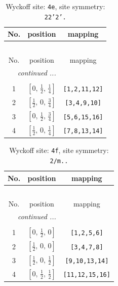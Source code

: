 \documentclass[fleqn,8pt]{jsarticle}
\begin{document}
\begin{longtable}{ccc}
\caption{Wyckoff site: {\tt 4e}, site symmetry: {\tt 22'2'.}}
 \\
 \hline \hline
No. & position & mapping \\ \hline \endfirsthead

\multicolumn{2}{l}{\tablename\ \thetable{}} \\
 \hline \hline
No. & position & mapping \\ \hline \endhead

 \hline \hline
\multicolumn{2}{r}{\footnotesize\it continued ...} \\ \endfoot

 \hline \hline
\multicolumn{2}{r}{} \\ \endlastfoot

1 & $\left[ 0,\, \frac{1}{2},\, \frac{1}{4} \right]$ & {\tt [1,2,11,12]} \\ \hline
2 & $\left[ \frac{1}{2},\, 0,\, \frac{3}{4} \right]$ & {\tt [3,4,9,10]} \\ \hline
3 & $\left[ 0,\, \frac{1}{2},\, \frac{3}{4} \right]$ & {\tt [5,6,15,16]} \\ \hline
4 & $\left[ \frac{1}{2},\, 0,\, \frac{1}{4} \right]$ & {\tt [7,8,13,14]} \\
\end{longtable}
\renewcommand{\arraystretch}{1.2}
\begin{longtable}{ccc}
\caption{Wyckoff site: {\tt 4f}, site symmetry: {\tt 2/m..}}
 \\
 \hline \hline
No. & position & mapping \\ \hline \endfirsthead

\multicolumn{2}{l}{\tablename\ \thetable{}} \\
 \hline \hline
No. & position & mapping \\ \hline \endhead

 \hline \hline
\multicolumn{2}{r}{\footnotesize\it continued ...} \\ \endfoot

 \hline \hline
\multicolumn{2}{r}{} \\ \endlastfoot

1 & $\left[ 0,\, \frac{1}{2},\, 0 \right]$ & {\tt [1,2,5,6]} \\ \hline
2 & $\left[ \frac{1}{2},\, 0,\, 0 \right]$ & {\tt [3,4,7,8]} \\ \hline
3 & $\left[ \frac{1}{2},\, 0,\, \frac{1}{2} \right]$ & {\tt [9,10,13,14]} \\ \hline
4 & $\left[ 0,\, \frac{1}{2},\, \frac{1}{2} \right]$ & {\tt [11,12,15,16]} \\
\end{longtable}
\end{document}
